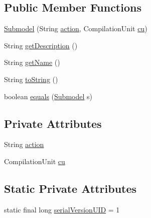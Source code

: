 \subsection*{Public Member Functions}
\begin{DoxyCompactItemize}
\item 
\hyperlink{classit_1_1isislab_1_1masonhelperdocumentation_1_1_o_d_d_1_1_submodel_a7ce9ce695c21aa30f802cfb0baf7d46d}{Submodel} (String \hyperlink{classit_1_1isislab_1_1masonhelperdocumentation_1_1_o_d_d_1_1_submodel_a5f62abde24f5d75865b6e77cf1d15807}{action}, Compilation\-Unit \hyperlink{classit_1_1isislab_1_1masonhelperdocumentation_1_1_o_d_d_1_1_submodel_a39701b80035981f257dc7e09a81e3115}{cu})
\item 
String \hyperlink{classit_1_1isislab_1_1masonhelperdocumentation_1_1_o_d_d_1_1_submodel_ac22c78907427d00f274530347f035149}{get\-Description} ()
\item 
String \hyperlink{classit_1_1isislab_1_1masonhelperdocumentation_1_1_o_d_d_1_1_submodel_a25ea4ffe85d1b3ce42d22160e573cb50}{get\-Name} ()
\item 
String \hyperlink{classit_1_1isislab_1_1masonhelperdocumentation_1_1_o_d_d_1_1_submodel_ab71b66743f9c7314f3e5ec16dccf9173}{to\-String} ()
\item 
boolean \hyperlink{classit_1_1isislab_1_1masonhelperdocumentation_1_1_o_d_d_1_1_submodel_a2bb03f7d258a5e882219eaf7dd3b8257}{equals} (\hyperlink{classit_1_1isislab_1_1masonhelperdocumentation_1_1_o_d_d_1_1_submodel}{Submodel} s)
\end{DoxyCompactItemize}
\subsection*{Private Attributes}
\begin{DoxyCompactItemize}
\item 
String \hyperlink{classit_1_1isislab_1_1masonhelperdocumentation_1_1_o_d_d_1_1_submodel_a5f62abde24f5d75865b6e77cf1d15807}{action}
\item 
Compilation\-Unit \hyperlink{classit_1_1isislab_1_1masonhelperdocumentation_1_1_o_d_d_1_1_submodel_a39701b80035981f257dc7e09a81e3115}{cu}
\end{DoxyCompactItemize}
\subsection*{Static Private Attributes}
\begin{DoxyCompactItemize}
\item 
static final long \hyperlink{classit_1_1isislab_1_1masonhelperdocumentation_1_1_o_d_d_1_1_submodel_aff94e093c834ac7fb7cc6bde2d1f2325}{serial\-Version\-U\-I\-D} = 1
\end{DoxyCompactItemize}


